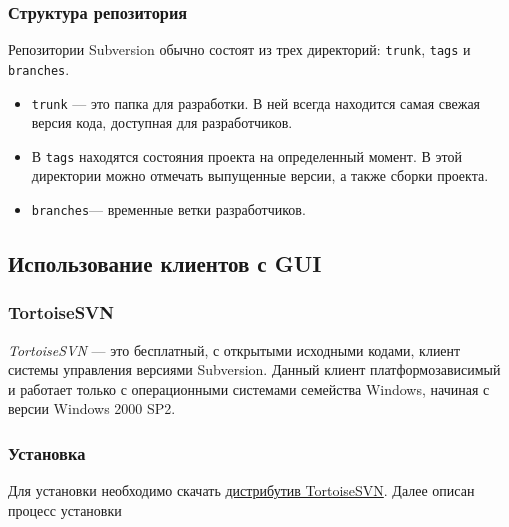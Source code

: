 \documentclass[a4paper,12pt]{article}
\begin{document}
\subsubsection{Структура репозитория}

Репозитории Subversion обычно состоят из трех директорий: \texttt{trunk},
\texttt{tags} и \texttt{branches}.
\begin{itemize}
  \item \texttt{trunk} — это папка для разработки. В ней всегда находится самая
  свежая версия кода, доступная для разработчиков.
  \item В \texttt{tags} находятся состояния проекта на определенный момент. В
  этой директории можно отмечать выпущенные версии, а также сборки проекта.
  \item \texttt{branches}— временные ветки разработчиков.
\end{itemize}

\clearpage
\subsection{Использование клиентов с GUI}
\setcounter{figure}{0}
\subsubsection{TortoiseSVN}

\emph{TortoiseSVN} --- это бесплатный, с открытыми исходными кодами,
клиент системы управления версиями Subversion. Данный клиент
платформозависимый и работает только с операционными системами семейства
Windows, начиная с версии Windows 2000 SP2. 
\subsubsection{Установка} 
Для установки необходимо скачать
\href{http://tortoisesvn.net/downloads.html}{дистрибутив TortoiseSVN}. Далее описан процесс установки
\end{document}

